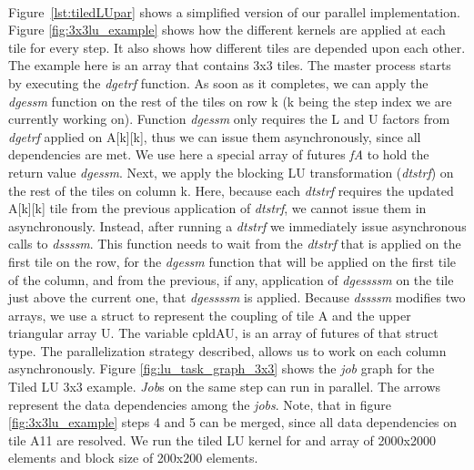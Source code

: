 \paragraph{}
	Figure~\ref{lst:tiledLUpar} shows a simplified version of our parallel implementation.  Figure \ref{fig:3x3lu_example}
shows how the different kernels are applied at each tile for every step.  It also shows how different tiles are depended
upon each other.  The example here is an array that contains 3x3 tiles.  The master process 
starts by executing the \emph{dgetrf}  function.  As soon as it completes, we can apply 
the \emph{dgessm} function on the rest of the tiles on row k (k being the step index we are currently working on).
Function \emph{dgessm} only requires the L and U factors from \emph{dgetrf} applied on A[k][k], thus we can issue them 
asynchronously, since all dependencies are met.
We use here a special array of futures \emph{fA} to hold the return value \emph{dgessm}.   
Next, we apply the blocking LU transformation (\emph{dtstrf}) on the rest of the tiles on column k.  Here, because
each \emph{dtstrf} requires the updated A[k][k] tile from the previous application of \emph{dtstrf}, we cannot issue
them in asynchronously.  Instead, after running a \emph{dtstrf} we immediately issue asynchronous calls to \emph{dssssm}.
This function needs to wait from the \emph{dtstrf} that is applied on the first tile on the row, for the \emph{dgessm}
function that will be applied on the first tile of the column, and from the previous, if any, application of \emph{dgessssm}
on the tile just above the current one, that \emph{dgessssm} is applied.  Because \emph{dssssm} modifies two arrays, we use
a struct to represent the coupling of tile A and the upper triangular array U.  The variable cpldAU, is an array of futures
of that struct type.  The parallelization strategy described, allows us to work on each column asynchronously.  
Figure \ref{fig:lu_task_graph_3x3} shows the \emph{job} graph for the Tiled LU 3x3 example.  \emph{Job}s on the same 
step can run in parallel.  The arrows represent the data dependencies among the \emph{jobs}.  Note, that in figure
\ref{fig:3x3lu_example} steps 4 and 5 can be merged, since all data dependencies on tile A11 are resolved.
We run the tiled LU kernel for and array of 2000x2000 elements and block size of 200x200 elements.


